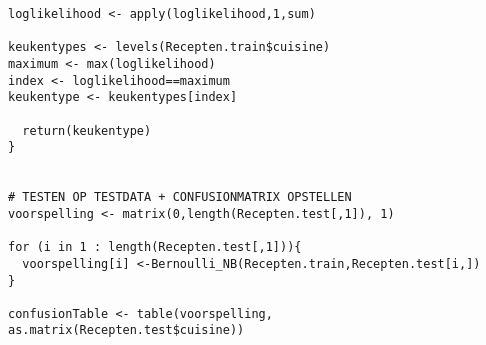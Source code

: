 \begin{lstlisting}
loglikelihood <- apply(loglikelihood,1,sum) 

keukentypes <- levels(Recepten.train$cuisine)
maximum <- max(loglikelihood)
index <- loglikelihood==maximum
keukentype <- keukentypes[index]
  
  return(keukentype)
}


# TESTEN OP TESTDATA + CONFUSIONMATRIX OPSTELLEN
voorspelling <- matrix(0,length(Recepten.test[,1]), 1)

for (i in 1 : length(Recepten.test[,1])){
  voorspelling[i] <-Bernoulli_NB(Recepten.train,Recepten.test[i,])
}

confusionTable <- table(voorspelling, as.matrix(Recepten.test$cuisine))

\end{lstlisting}
\fi